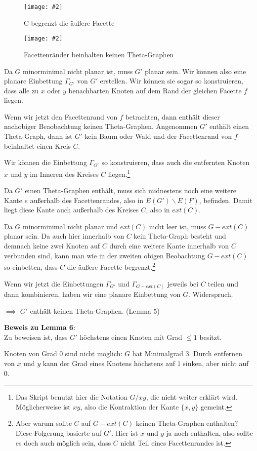 \documentclass[10pt,a4paper]{article}
\makeatletter
\def\maxwidth#1{\ifdim\Gin@nat@width>#1 #1\else\Gin@nat@width\fi}
\newcommand{\imageFigure}[4]{%
    \begin{figure}[h]%
        \centering%
        {%
            \setlength{\fboxsep}{1pt}%
            \setlength{\fboxrule}{1pt}%
            \texttt{[image: \#2]}%
        }%
        \caption{#1}%
        \label{fig:#4}%
    \end{figure}%
}
\makeatother
\begin{document}
\imageFigure{C begrenzt die äußere Facette}{c-outer.png}{.5}{c-outer}
\imageFigure{Facettenränder beinhalten keinen Theta-Graphen}{face-no-theta.png}{.25}{face-no-theta}

Da $G$ minorminimal nicht planar ist, muss $G'$ planar sein.
Wir können also eine planare Einbettung $\Gamma_{G'}$ von $G'$ erstellen.
Wir können sie sogar so konstruieren, dass alle zu $x$ oder $y$ benachbarten
Knoten auf dem Rand der gleichen Facette $f$ liegen.

Wenn wir jetzt den Facettenrand von $f$ betrachten, dann enthält dieser
nachobiger Beaobachtung keinen Theta-Graphen.
Angenommen $G'$ enthält einen Theta-Graph, dann ist $G'$ kein Baum oder Wald
und der Facettenrand von $f$ beinhaltet einen Kreis $C$.

Wir können die Einbettung $\Gamma_{G'}$ so konstruieren, dass auch die
entfernten Knoten $x$ und $y$ im Inneren des Kreises $C$ liegen.\footnote{Das
Skript benutzt hier die Notation $G/xy$, die nicht weiter erklärt wird.
Möglicherweise ist $xy$, also die Kontraktion der Kante $\{x, y\}$ gemeint.}

Da $G'$ einen Theta-Graphen enthält, muss sich midnestens noch eine weitere
Kante $e$ außerhalb des Facettenrandes, also in $E(G') \backslash E(F)$,
befinden.
Damit liegt diese Kante auch außerhalb des Kreises $C$, also in $ext(C)$.

Da $G$ minorminimal nicht planar und $ext(C)$ nicht leer ist, muss $G-ext(C)$
planar sein.
Da auch hier innerhalb von $C$ kein Theta-Graph besteht und demnach keine zwei
Knoten auf $C$ durch eine weitere Kante innerhalb von $C$ verbunden sind, kann
man wie in der zweiten obigen Beobachtung $G-ext(C)$ so einbetten, dass $C$
die äußere Facette begrenzt.\footnote{Aber warum sollte $C$ auf $G-ext(C)$
keinen Theta-Graphen enthalten? Diese Folgerung basierte auf $G'$. Hier ist $x$
und $y$ ja noch enthalten, also sollte es doch auch möglich sein, dass $C$
nicht Teil eines Facettenrandes ist.}

Wenn wir jetzt die Einbettungen $\Gamma_{G'}$ und $\Gamma_{G-ext(C)}$ jeweils
bei $C$ teilen und dann kombinieren, haben wir eine planare Einbettung von $G$.
Widerspruch.

$\implies$ $G'$ enthält keinen Theta-Graphen. (Lemma 5)

\textbf{Beweis zu Lemma 6}:\\
Zu beweisen ist, dass $G'$ höchstens einen Knoten mit Grad $\leq 1$ besitzt.

Knoten von Grad 0 sind nicht möglich:
$G$ hat Minimalgrad 3.
Durch entfernen von $x$ und $y$ kann der Grad eines Knotens höchstens auf 1
sinken, aber nicht auf 0.
\end{document}
